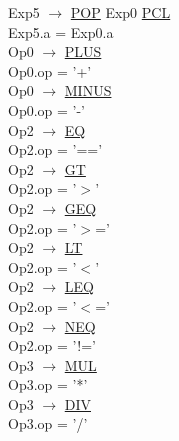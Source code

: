 \documentclass[\main/MemoriaPL.tex]{subfiles}
\begin{document}
    Exp5 $\rightarrow$ \underline{POP} Exp0 \underline{PCL}\\
    \hspace*{5mm}Exp5.a = Exp0.a\\
    Op0 $\rightarrow$ \underline{PLUS}\\
    \hspace*{5mm}Op0.op = '+'\\
    Op0 $\rightarrow$ \underline{MINUS}\\
    \hspace*{5mm}Op0.op = '-'\\
    Op2 $\rightarrow$ \underline{EQ}\\
    \hspace*{5mm}Op2.op = '=='\\
    Op2 $\rightarrow$ \underline{GT}\\
    \hspace*{5mm}Op2.op = '$>$'\\
    Op2 $\rightarrow$ \underline{GEQ}\\
    \hspace*{5mm}Op2.op = '$>$='\\
    Op2 $\rightarrow$ \underline{LT}\\
    \hspace*{5mm}Op2.op = '$<$'\\
    Op2 $\rightarrow$ \underline{LEQ}\\
    \hspace*{5mm}Op2.op = '$<$='\\
    Op2 $\rightarrow$ \underline{NEQ}\\
    \hspace*{5mm}Op2.op = '!='\\
    Op3 $\rightarrow$ \underline{MUL}\\
    \hspace*{5mm}Op3.op = '*'\\
    Op3 $\rightarrow$ \underline{DIV}\\
    \hspace*{5mm}Op3.op = '/'\\
\end{document}
